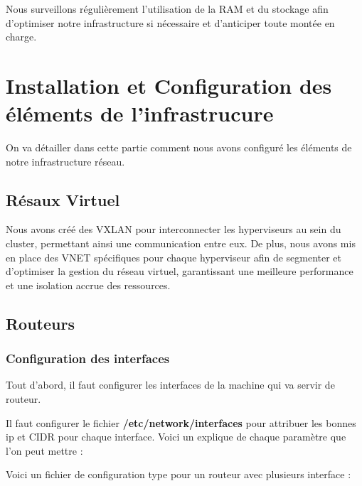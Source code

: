 \documentclass{article}
\begin{document}
Nous surveillons régulièrement l’utilisation de la RAM et du stockage afin d’optimiser notre infrastructure si nécessaire et d’anticiper toute montée en charge.

\section{Installation et Configuration des éléments de l'infrastrucure}
On va détailler dans cette partie comment nous avons configuré les éléments de notre infrastructure réseau.
\subsection{Résaux Virtuel}

Nous avons créé des VXLAN pour interconnecter les hyperviseurs au sein du cluster, permettant ainsi une communication entre eux. De plus, nous avons mis en place des VNET spécifiques pour chaque hyperviseur afin de segmenter et d’optimiser la gestion du réseau virtuel, garantissant une meilleure performance et une isolation accrue des ressources.

\subsection{Routeurs}
\subsubsection{Configuration des interfaces}
Tout d'abord, il faut configurer les interfaces de la machine qui va servir de routeur.

Il faut configurer le fichier \textbf{/etc/network/interfaces} pour attribuer les bonnes ip et CIDR pour chaque interface. Voici un explique de chaque paramètre que l’on peut mettre :

\newpage



Voici un fichier de configuration type pour un routeur avec plusieurs interface :
\end{document}
